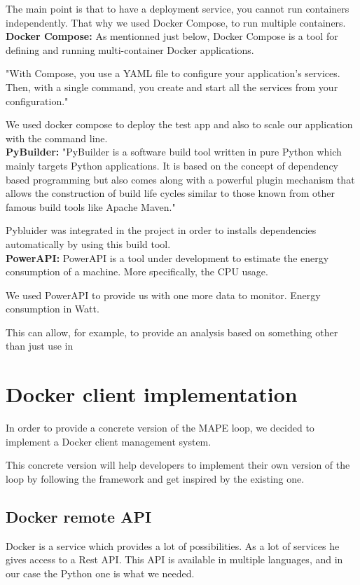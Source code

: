 \documentclass[11pt]{IEEEtran}
\begin{document}
The main point is that to have a deployment service, you cannot run containers independently. That why we used Docker Compose, to run multiple containers.\\

\textbf{Docker Compose:}
As mentionned just below, Docker Compose is a tool for defining and running multi-container Docker applications. 

"With Compose, you use a YAML file to configure your application’s services. Then, with a single command, you create and start all the services from your configuration." \cite{b1}

We used docker compose to deploy the test app and also to scale our application with the command line.\\


\textbf{PyBuilder:}
"PyBuilder is a software build tool written in pure Python which mainly targets Python applications. It is based on the concept of dependency based programming but also comes along with a powerful plugin mechanism that allows the construction of build life cycles similar to those known from other famous build tools like Apache Maven."\cite{b2}

Pybluider was integrated in the project in order to installs dependencies automatically by using this build tool.\\

\textbf{PowerAPI:}
PowerAPI is a tool under development to estimate the energy consumption of a machine. More specifically, the CPU usage.

We used PowerAPI to provide us with one more data to monitor. Energy consumption in Watt.

This can allow, for example, to provide an analysis based on something other than just use in %


\section{Docker client implementation}
In order to provide a concrete version of the MAPE loop, we decided to implement a Docker client management system. 

This concrete version will help developers to implement their own version of the loop by following the framework and get inspired by the existing one.

\subsection{Docker remote API}
Docker is a service which provides a lot of possibilities. As a lot of services he gives access to a Rest API. This API is available in multiple languages, and in our case the Python one is what we needed. 
\end{document}
